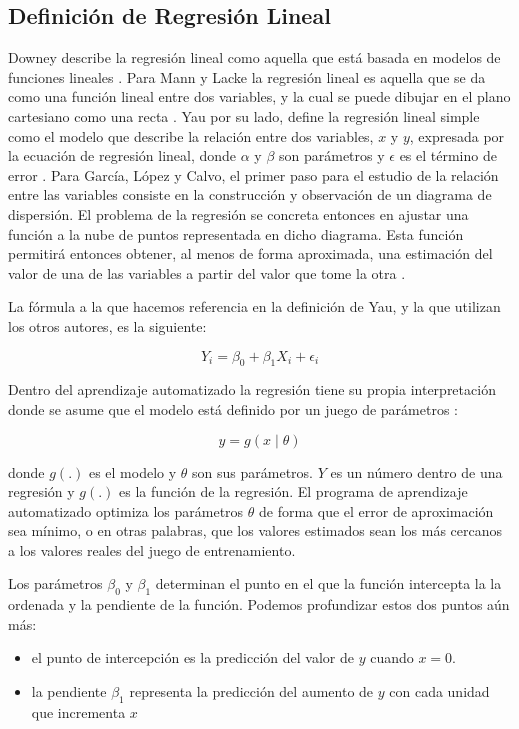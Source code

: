 \subsection{Definición de Regresión Lineal}
Downey describe la regresión lineal como aquella que está basada en modelos de funciones lineales \cite{thinkStats}. Para Mann y Lacke la regresión lineal es aquella que se da como una función lineal entre dos variables, y la cual se puede dibujar en el plano cartesiano como una recta \cite{intoStats7}. Yau por su lado, define la regresión lineal simple como el modelo que describe la relación entre dos variables, $x$ y $y$, expresada por la ecuación de regresión lineal, donde $\alpha$ y $\beta$ son parámetros y $\epsilon$ es el término de error \cite{yau}. Para García, López y Calvo, el primer paso para el estudio de la relación entre las variables consiste en la construcción y observación de un diagrama de dispersión. El problema de la regresión se concreta entonces en ajustar una función a la nube de puntos representada en dicho diagrama. Esta función permitirá entonces obtener, al menos de forma aproximada, una estimación del valor de una de las variables a partir del valor que tome la otra \cite{estadisticaBasica}.

La fórmula a la que hacemos referencia en la definición de Yau, y la que utilizan los otros autores, es la siguiente:

\begin{equation}
	Y_{i} = \beta_{0} + \beta_{1}X_{i} + \epsilon_{i}
\end{equation}

Dentro del aprendizaje automatizado la regresión tiene su propia interpretación donde se asume que el modelo está definido por un juego de parámetros \cite{alpaydin}:

\begin{equation}
	y = g(x \mid \theta)
\end{equation}

donde $g(.)$ es el modelo y $\theta$ son sus parámetros. $Y$ es un número dentro de una regresión y $g(.)$ es la función de la regresión. El programa de aprendizaje automatizado optimiza los parámetros $\theta$ de forma que el error de aproximación sea mínimo, o en otras palabras, que los valores estimados sean los más cercanos a los valores reales del juego de entrenamiento.

Los parámetros $\beta_{0}$ y $\beta_{1}$ determinan el punto en el que la función intercepta la la ordenada y la pendiente de la función. Podemos profundizar estos dos puntos aún más:
\begin{itemize}
	\item el punto de intercepción es la predicción del valor de $y$ cuando $x=0$.
    \item la pendiente $\beta_{1}$ representa la predicción del aumento de $y$ con cada unidad que incrementa $x$
\end{itemize}

